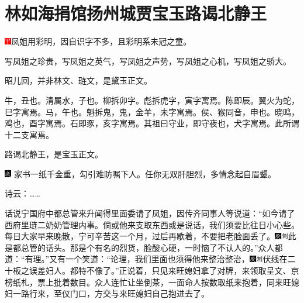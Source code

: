 

\chapter{林如海捐馆扬州城\hspace{.5em}贾宝玉路谒北静王}

{\includegraphics[width=3mm]{../Images/00002}凤姐用彩明，因自识字不多，且彩明系未冠之童。}

{写凤姐之珍贵，写凤姐之英气，写凤姐之声势，写凤姐之心机，写凤姐之骄大。}

{昭儿回，并非林文、琏文，是黛玉正文。}

{牛，丑也。清属水，子也。柳拆卯字。彪拆虎字，寅字寓焉。陈即辰。翼火为蛇，巳字寓焉。马，午也。魁拆鬼，鬼，金羊，未字寓焉。侯、猴同音，申也。晓鸣，鸡也，酉字寓焉。石即豕，亥字寓焉。其祖曰守业，即守夜也，犬字寓焉。此所谓十二支寓焉。}

{路谒北静王，是宝玉正文。}

{\includegraphics[width=3mm]{../Images/00005}  \kaishu 家书一纸千金重，勾引难防嘱下人。任你无双肝胆烈，多情念起自眉颦。}

诗云：\ldots{}\ldots{}

话说宁国府中都总管来升闻得里面委请了凤姐，因传齐同事人等说道：``如今请了西府里琏二奶奶管理内事。倘或他来支取东西或是说话，我们须要比往日小心些。每日大家早来晚散，宁可辛苦这一个月，过后再歇着，不要把老脸面丢了。{\includegraphics[width=3mm]{../Images/00004}\includegraphics[width=3mm]{../Images/00011}\footnotesize \kaishu 此是都总管的话头。}那是个有名的烈货，脸酸心硬，一时恼了不认人的。''众人都道：``有理。''又有一个笑道：``论理，我们里面也须得他来整治整治，{\includegraphics[width=3mm]{../Images/00004}\includegraphics[width=3mm]{../Images/00011}\footnotesize \kaishu 伏线在二十板之误差妇人。}都特不像了。''正说着，只见来旺媳妇拿了对牌，来领取呈文、京榜纸札，票上批着数目。众人连忙让坐倒茶，一面命人按数取纸来抱着，同来旺媳妇一路行来，至仪门口，方交与来旺媳妇自己抱进去了。

